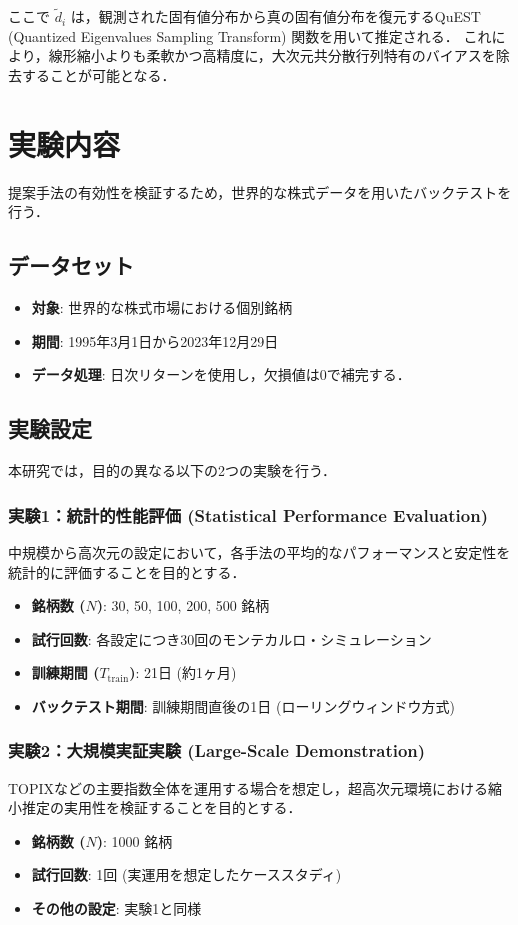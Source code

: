 \documentclass[lualatex,a4paper,11pt]{jlreq}
\begin{document}
ここで $\tilde{d}_i$ は，観測された固有値分布から真の固有値分布を復元するQuEST (Quantized Eigenvalues Sampling Transform) 関数を用いて推定される．
これにより，線形縮小よりも柔軟かつ高精度に，大次元共分散行列特有のバイアスを除去することが可能となる．

\section{実験内容}
提案手法の有効性を検証するため，世界的な株式データを用いたバックテストを行う．

\subsection{データセット}
\begin{itemize}
    \item \textbf{対象}: 世界的な株式市場における個別銘柄
    \item \textbf{期間}: 1995年3月1日から2023年12月29日
    \item \textbf{データ処理}: 日次リターンを使用し，欠損値は0で補完する．
\end{itemize}

\subsection{実験設定}
本研究では，目的の異なる以下の2つの実験を行う．

\subsubsection{実験1：統計的性能評価 (Statistical Performance Evaluation)}
中規模から高次元の設定において，各手法の平均的なパフォーマンスと安定性を統計的に評価することを目的とする．
\begin{itemize}
    \item \textbf{銘柄数 ($N$)}: 30, 50, 100, 200, 500 銘柄
    \item \textbf{試行回数}: 各設定につき30回のモンテカルロ・シミュレーション
    \item \textbf{訓練期間 ($T_{\text{train}}$)}: 21日 (約1ヶ月)
    \item \textbf{バックテスト期間}: 訓練期間直後の1日 (ローリングウィンドウ方式)
\end{itemize}

\subsubsection{実験2：大規模実証実験 (Large-Scale Demonstration)}
TOPIXなどの主要指数全体を運用する場合を想定し，超高次元環境における縮小推定の実用性を検証することを目的とする．
\begin{itemize}
    \item \textbf{銘柄数 ($N$)}: 1000 銘柄
    \item \textbf{試行回数}: 1回 (実運用を想定したケーススタディ)
    \item \textbf{その他の設定}: 実験1と同様
\end{itemize}
\end{document}

